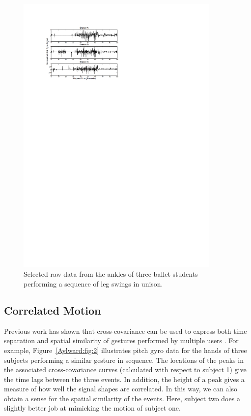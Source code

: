 \begin{figure}[t]
\centering
\includegraphics[width=100mm]{jp_fig3} 
\caption{Selected raw data from the ankles of three ballet students
performing a sequence of leg swings in unison.}
\label{Aylward:fig:3} 
\end{figure}

\subsection{Correlated Motion}


Previous work has shown that cross-covariance can be used to express both time
separation and spatial similarity of gestures performed by multiple users \cite{Aylward:2006a}.
For example, Figure~\ref{Aylward:fig:2} illustrates pitch gyro data for the hands of three subjects
performing a similar gesture in sequence. The locations of the peaks in the
associated cross-covariance curves (calculated with respect to subject 1) give
the time lags between the three events. In addition, the height of a peak gives a
measure of how well the signal shapes are correlated. In this way, we can also
obtain a sense for the spatial similarity of the events. Here, subject two does a
slightly better job at mimicking the motion of subject one.

